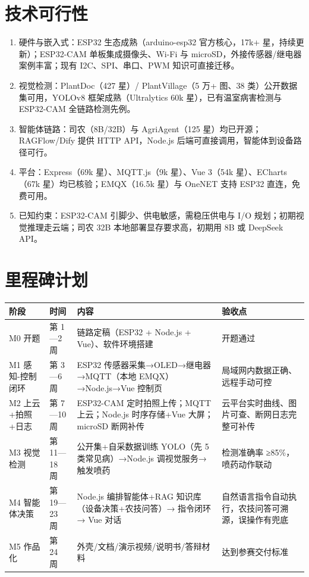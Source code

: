 \documentclass[11pt]{ctexart}
\begin{document}
\section{技术可行性}
\begin{enumerate}
  \item 硬件与嵌入式：ESP32 生态成熟（arduino-esp32 官方核心，17k+ 星，持续更新）；ESP32-CAM 单板集成摄像头、Wi-Fi 与 microSD，外接传感器/继电器案例丰富；现有 I2C、SPI、串口、PWM 知识可直接迁移。
  \item 视觉检测：PlantDoc（427 星）/ PlantVillage（5 万+ 图、38 类）公开数据集可用，YOLOv8 框架成熟（Ultralytics 60k 星），已有温室病害检测与 ESP32-CAM 全链路检测先例。
  \item 智能体链路：司农（8B/32B）与 AgriAgent（125 星）均已开源；RAGFlow/Dify 提供 HTTP API，Node.js 后端可直接调用，智能体到设备路径可行。
  \item 平台：Express（69k 星）、MQTT.js（9k 星）、Vue 3（54k 星）、ECharts（67k 星）均已核验；EMQX（16.5k 星）与 OneNET 支持 ESP32 直连，免费可用。
  \item 已知约束：ESP32-CAM 引脚少、供电敏感，需稳压供电与 I/O 规划；初期视觉推理走云端；司农 32B 本地部署显存要求高，初期用 8B 或 DeepSeek API。
\end{enumerate}

\section{里程碑计划}
\begin{longtable}{p{2.2cm}p{1.7cm}p{6.5cm}p{4.0cm}}
  \toprule
  阶段 & 时间 & 内容 & 验收点 \\
  \midrule
  M0 开题 & 第 1—2 周 & 链路定稿（ESP32 + Node.js + Vue）、软件环境搭建 & 开题通过 \\
  M1 感知-控制闭环 & 第 3—6 周 & ESP32 传感器采集→OLED→继电器→MQTT（本地 EMQX）→Node.js→Vue 控制页 & 局域网内数据正确、远程手动可控 \\
  M2 上云+拍照+日志 & 第 7—10 周 & ESP32-CAM 定时拍照上传；MQTT 上云；Node.js 时序存储+Vue 大屏；microSD 断网补传 & 云平台实时曲线、图片可查、断网日志完整可补传 \\
  M3 视觉检测 & 第 11—18 周 & 公开集+自采数据训练 YOLO（先 5 类常见病）→Node.js 调视觉服务→触发喷药 & 检测准确率 ≥85\%，喷药动作联动 \\
  M4 智能体决策 & 第 19—23 周 & Node.js 编排智能体+RAG 知识库（设备决策+农技问答）→ 指令闭环 → Vue 对话 & 自然语言指令自动执行，农技问答可溯源，误操作有兜底 \\
  M5 作品化 & 第 24 周 & 外壳/文档/演示视频/说明书/答辩材料 & 达到参赛交付标准 \\
  \bottomrule
\end{longtable}
\end{document}
